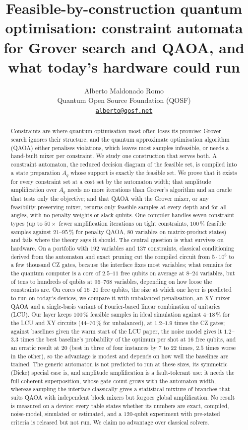 \documentclass[10pt,twocolumn]{article}
\title{\textbf{Feasible-by-construction quantum optimisation: constraint automata for Grover search and QAOA, and what today's hardware could run}}
\author{Alberto Maldonado Romo\\ \small Quantum Open Source Foundation (QOSF)\\ \small \href{mailto:alberto@qosf.net}{\texttt{alberto@qosf.net}}}
\date{}
\begin{document}
\maketitle
\begin{abstract}
Constraints are where quantum optimisation most often loses its promise: Grover search ignores their structure, and the quantum approximate optimisation algorithm (QAOA) either penalises violations, which leaves most samples infeasible, or needs a hand-built mixer per constraint. We study one construction that serves both. A constraint automaton, the reduced decision diagram of the feasible set, is compiled into a state preparation $A_q$ whose support is exactly the feasible set. We prove that it exists for every constraint set at a cost set by the automaton width; that amplitude amplification over $A_q$ needs no more iterations than Grover's algorithm and an oracle that tests only the objective; and that QAOA with the Grover mixer, or any feasibility-preserving mixer, returns only feasible samples at every depth and for all angles, with no penalty weights or slack qubits. One compiler handles seven constraint types (up to $50\times$ fewer amplification iterations on tight constraints, $100\,\%$ feasible samples against $21$--$95\,\%$ for penalty QAOA, $80$ variables on matrix-product states) and fails where the theory says it should. The central question is what survives on hardware. On a portfolio with $192$ variables and $137$ constraints, classical conditioning derived from the automaton and exact pruning cut the compiled circuit from $5\cdot10^{6}$ to a few thousand CZ gates, because the interface fixes most variables; what remains for the quantum computer is a core of $2.5$--$11$ free qubits on average at $8$--$24$ variables, but of tens to hundreds of qubits at $96$--$768$ variables, depending on how loose the constraints are. On cores of $16$--$20$ free qubits, the size at which one layer is predicted to run on today's devices, we compare it with unbalanced penalisation, an XY-mixer QAOA and a single-basis variant of Fourier-based linear combination of unitaries (LCU). Our layer keeps $100\,\%$ feasible samples in ideal simulation against $4$--$18\,\%$ for the LCU and XY circuits ($44$--$70\,\%$ for unbalanced), at $1.2$--$1.9$ times the CZ gates; against baselines given the warm start of the LCU paper, the noise model gives it $1.2$--$3.3$ times the best baseline's probability of the optimum per shot at $16$ free qubits, and an erratic result at $20$ (best in three of four instances by $7$ to $22$ times, $2.5$ times worse in the other), so the advantage is modest and depends on how well the baselines are trained. The generic automaton is not predicted to run at these sizes, its symmetric (Dicke) special case is, and amplitude amplification is a fault-tolerant use: it needs the full coherent superposition, whose gate count grows with the automaton width, whereas sampling the interface classically gives a statistical mixture of branches that suits QAOA with independent block mixers but forgoes global amplification. No result is measured on a device: every table states whether its numbers are exact, compiled, noise-model, simulated or estimated, and a $120$-qubit experiment with pre-stated criteria is released but not run. We claim no advantage over classical solvers.

\end{abstract}
\end{document}
